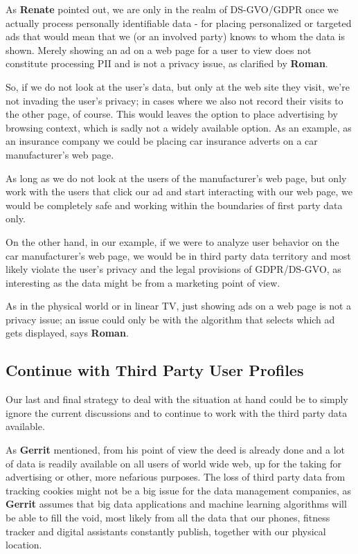 As \textbf{Renate} pointed out, we are only in the realm of DS-GVO/GDPR once we actually process personally identifiable data - for placing personalized or targeted ads that would mean that we (or an involved party) knows to whom the data is shown. Merely showing an ad on a web page for a user to view does not constitute processing PII and is not a privacy issue, as clarified by \textbf{Roman}.

So, if we do not look at the user's data, but only at the web site they visit, we're not invading the user's privacy; in cases where we also not record their visits to the other page, of course. This would leaves the option to place advertising by browsing context, which is sadly not a widely available option. As an example, as an insurance company we could be placing car insurance adverts on a car manufacturer's web page. 

As long as we do not look at the users of the manufacturer's web page, but only work with the users that click our ad and start interacting with our web page, we would be completely safe and working within the boundaries of first party data only.

On the other hand, in our example, if we were to analyze user behavior on the car manufacturer's web page, we would be in third party data territory and most likely violate the user's privacy and the legal provisions of GDPR/DS-GVO, as interesting as the data might be from a marketing point of view.

As in the physical world or in linear TV, just showing ads on a web page is not a privacy issue; an issue could only be with the algorithm that selects which ad gets displayed, says \textbf{Roman}.

\subsection{Continue with Third Party User Profiles}

Our last and final strategy to deal with the situation at hand could be to simply ignore the current discussions and to continue to work with the third party data available.

As \textbf{Gerrit} mentioned, from his point of view the deed is already done and a lot of data is readily available on all users of world wide web, up for the taking for advertising or other, more nefarious purposes. The loss of third party data from tracking cookies might not be a big issue for the data management companies, as \textbf{Gerrit} assumes that big data applications and machine learning algorithms will be able to fill the void, most likely from all the data that our phones, fitness tracker and digital assistants constantly publish, together with our physical location.

